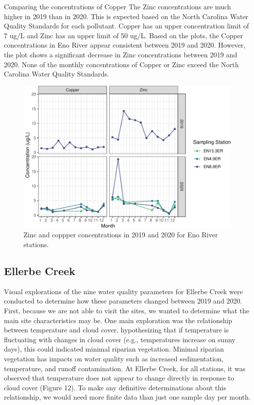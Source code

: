 \documentclass[
  12pt,
]{article}
\begin{document}
Comparing the concentrations of Copper The Zinc concentrations are much
higher in 2019 than in 2020. This is expected based on the North
Carolina Water Quality Standards for each pollutant. Copper has an upper
concentration limit of 7 ug/L and Zinc has an upper limit of 50 ug/L.
Based on the plots, the Copper concentrations in Eno River appear
consistent between 2019 and 2020. However, the plot shows a significant
decrease in Zinc concentrations between 2019 and 2020. None of the
monthly concentrations of Copper or Zinc exceed the North Carolina Water
Quality Standards.

\begin{figure}
\centering
\includegraphics{August_Lindborg_ENV872_Project_files/figure-latex/unnamed-chunk-12-1.pdf}
\caption{Zinc and coppper concentrations in 2019 and 2020 for Eno River
stations.}
\end{figure}

\newpage

\hypertarget{ellerbe-creek}{%
\subsection{Ellerbe Creek}\label{ellerbe-creek}}

Visual explorations of the nine water quality parameters for Ellerbe
Creek were conducted to determine how these parameters changed between
2019 and 2020. First, because we are not able to visit the sites, we
wanted to determine what the main site characteristics may be. One main
exploration was the relationship between temperature and cloud cover,
hypothesizing that if temperature is fluctuating with changes in cloud
cover (e.g., temperatures increase on sunny days), this could indicated
minimal riparian vegetation. Minimal riparian vegetation has impacts on
water quality such as increased sedimentation, temperature, and runoff
contamination. At Ellerbe Creek, for all stations, it was observed that
temperature does not appear to change directly in response to cloud
cover (Figure 12). To make any definitive determinations about this
relationship, we would need more finite data than just one sample day
per month.
\end{document}
